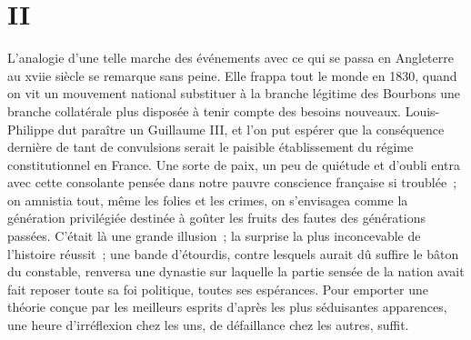 \documentclass[french,twoside]{book} %
\begin{document}
\section[{II}]{II}\renewcommand{\leftmark}{II}

\noindent L’analogie d’une telle marche des événements avec ce qui se passa en Angleterre au xviie siècle se remarque sans peine. Elle frappa tout le monde en 1830, quand on vit un mouvement national substituer à la branche légitime des Bourbons une branche collatérale plus disposée à tenir compte des besoins nouveaux. Louis-Philippe dut paraître un Guillaume III, et l’on put espérer que la conséquence dernière de tant de convulsions serait le paisible établissement du régime constitutionnel en France. Une sorte de paix, un peu de quiétude et d’oubli entra avec cette consolante pensée dans notre pauvre conscience française si troublée ; on amnistia tout, même les folies et les crimes, on s’envisagea comme la génération privilégiée destinée à goûter les fruits des fautes des générations passées. C’était là une grande illusion ; la surprise la plus inconcevable de l’histoire réussit ; une bande d’étourdis, contre lesquels aurait dû suffire le bâton du constable, renversa une dynastie sur laquelle la partie sensée de la nation avait fait reposer toute sa foi politique, toutes ses espérances. Pour emporter une théorie conçue par les meilleurs esprits d’après les plus séduisantes apparences, une heure d’irréflexion chez les uns, de défaillance chez les autres, suffit.\par
\end{document}

